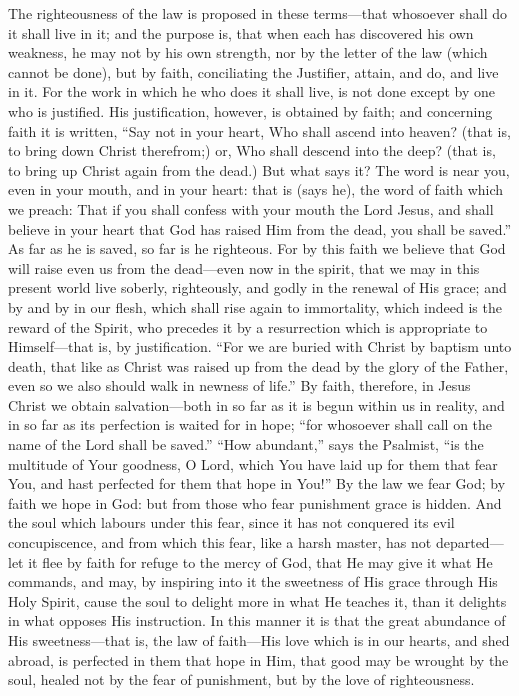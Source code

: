 \documentclass[10pt, twocolumn, oneside, a4paper]{memoir}
\newcommand{\gloss}[1]{%
    \marginpar[\RaggedLeft \footnotesize{#1}]{\RaggedRight \footnotesize{#1}}}
\begin{document}
The righteousness of the law is proposed in these terms—that whosoever shall do it shall live in it; and the purpose is, that when each has discovered his own weakness, he may not by his own strength, nor by the letter of the law (which cannot be done), but by faith, conciliating the Justifier, attain, and do, and live in it. For the work in which he who does it shall live, is not done except by one who is justified. His justification, however, is obtained by faith; and concerning faith it is written, ``Say not in your heart, Who shall ascend into heaven? (that is, to bring down Christ therefrom;) or, Who shall descend into the deep? (that is, to bring up Christ again from the dead.) But what says it? The word is near you, even in your mouth, and in your heart: that is (says he), the word of faith which we preach: That if you shall confess with your mouth the Lord Jesus, and shall believe in your heart that God has raised Him from the dead, you shall be saved.'' \gloss{Romans 10:6-9} As far as he is saved, so far is he righteous. For by this faith we believe that God will raise even us from the dead—even now in the spirit, that we may in this present world live soberly, righteously, and godly in the renewal of His grace; and by and by in our flesh, which shall rise again to immortality, which indeed is the reward of the Spirit, who precedes it by a resurrection which is appropriate to Himself—that is, by justification. ``For we are buried with Christ by baptism unto death, that like as Christ was raised up from the dead by the glory of the Father, even so we also should walk in newness of life.'' \gloss{Romans 6:4} By faith, therefore, in Jesus Christ we obtain salvation—both in so far as it is begun within us in reality, and in so far as its perfection is waited for in hope; ``for whosoever shall call on the name of the Lord shall be saved.''  ``How abundant,'' says the Psalmist, ``is the multitude of Your goodness, O Lord, which You have laid up for them that fear You, and hast perfected for them that hope in You!''  By the law we fear God; by faith we hope in God: but from those who fear punishment grace is hidden. And the soul which labours under this fear, since it has not conquered its evil concupiscence, and from which this fear, like a harsh master, has not departed—let it flee by faith for refuge to the mercy of God, that He may give it what He commands, and may, by inspiring into it the sweetness of His grace through His Holy Spirit, cause the soul to delight more in what He teaches it, than it delights in what opposes His instruction. In this manner it is that the great abundance of His sweetness—that  is, the law of faith—His love which is in our hearts, and shed abroad, is perfected in them that hope in Him, that good may be wrought by the soul, healed not by the fear of punishment, but by the love of righteousness.
\end{document}
